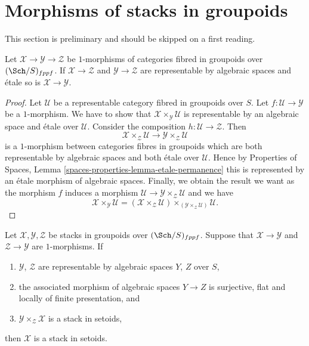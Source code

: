 \section{Morphisms of stacks in groupoids}
\label{section-1-morphisms}

\noindent
This section is preliminary and should be skipped on a first reading.

\begin{lemma}
\label{lemma-etale-permanence}
Let $\mathcal{X} \to \mathcal{Y} \to \mathcal{Z}$
be $1$-morphisms of categories fibred in groupoids over
$(\Sch/S)_{fppf}$.
If $\mathcal{X} \to \mathcal{Z}$ and $\mathcal{Y} \to \mathcal{Z}$ are
representable by algebraic spaces and \'etale so is
$\mathcal{X} \to \mathcal{Y}$.
\end{lemma}

\begin{proof}
Let $\mathcal{U}$ be a representable category fibred in groupoids over $S$.
Let $f : \mathcal{U} \to \mathcal{Y}$ be a $1$-morphism. We have to show that
$\mathcal{X} \times_\mathcal{Y} \mathcal{U}$ is representable by an
algebraic space and \'etale over $\mathcal{U}$.
Consider the composition $h : \mathcal{U} \to \mathcal{Z}$. Then
$$
\mathcal{X} \times_\mathcal{Z} \mathcal{U}
\longrightarrow
\mathcal{Y} \times_\mathcal{Z} \mathcal{U}
$$
is a $1$-morphism between categories fibres in groupoids which are both
representable by algebraic spaces and both \'etale over $\mathcal{U}$.
Hence by
Properties of Spaces, Lemma \ref{spaces-properties-lemma-etale-permanence}
this is represented by an \'etale morphism of algebraic spaces.
Finally, we obtain the result we want as the morphism $f$ induces
a morphism $\mathcal{U} \to \mathcal{Y} \times_\mathcal{Z} \mathcal{U}$
and we have
$$
\mathcal{X} \times_\mathcal{Y} \mathcal{U} =
(\mathcal{X} \times_\mathcal{Z} \mathcal{U})
\times_{(\mathcal{Y} \times_\mathcal{Z} \mathcal{U})}
\mathcal{U}.
$$
\end{proof}

\begin{lemma}
\label{lemma-stack-in-setoids-descent}
Let $\mathcal{X}, \mathcal{Y}, \mathcal{Z}$ be stacks in groupoids
over $(\Sch/S)_{fppf}$. Suppose that $\mathcal{X} \to \mathcal{Y}$
and $\mathcal{Z} \to \mathcal{Y}$ are $1$-morphisms.
If
\begin{enumerate}
\item $\mathcal{Y}$, $\mathcal{Z}$ are representable by algebraic spaces
$Y$, $Z$ over $S$,
\item the associated morphism of algebraic spaces $Y \to Z$ is surjective,
flat and locally of finite presentation, and
\item $\mathcal{Y} \times_\mathcal{Z} \mathcal{X}$ is a stack in
setoids,
\end{enumerate}
then $\mathcal{X}$ is a stack in setoids.
\end{lemma}

